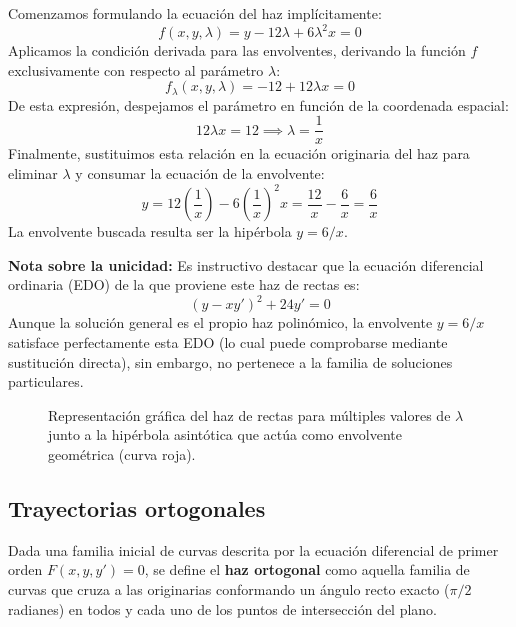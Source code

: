 \begin{tcolorbox}
Comenzamos formulando la ecuación del haz implícitamente:
$$ f(x, y, \lambda) = y - 12\lambda + 6\lambda^2 x = 0 $$
Aplicamos la condición derivada para las envolventes, derivando la función $f$ exclusivamente con respecto al parámetro $\lambda$:
$$ f_\lambda(x, y, \lambda) = -12 + 12\lambda x = 0 $$
De esta expresión, despejamos el parámetro en función de la coordenada espacial:
$$ 12\lambda x = 12 \implies \lambda = \frac{1}{x} $$
Finalmente, sustituimos esta relación en la ecuación originaria del haz para eliminar $\lambda$ y consumar la ecuación de la envolvente:
$$ y = 12\left(\frac{1}{x}\right) - 6\left(\frac{1}{x}\right)^2 x = \frac{12}{x} - \frac{6}{x} = \frac{6}{x} $$
La envolvente buscada resulta ser la hipérbola $y = 6/x$.

\textbf{Nota sobre la unicidad:} Es instructivo destacar que la ecuación diferencial ordinaria (EDO) de la que proviene este haz de rectas es:
$$ (y - xy')^2 + 24y' = 0 $$
Aunque la solución general es el propio haz polinómico, la envolvente $y = 6/x$ satisface perfectamente esta EDO (lo cual puede comprobarse mediante sustitución directa), sin embargo, no pertenece a la familia de soluciones particulares.

\begin{figure}[H]
    \centering
    
    \caption{Representación gráfica del haz de rectas para múltiples valores de $\lambda$ junto a la hipérbola asintótica que actúa como envolvente geométrica (curva roja).}
\end{figure}
\end{tcolorbox}

\subsection{Trayectorias ortogonales}

Dada una familia inicial de curvas descrita por la ecuación diferencial de primer orden $F(x, y, y') = 0$, se define el \textbf{haz ortogonal} como aquella familia de curvas que cruza a las originarias conformando un ángulo recto exacto ($\pi/2$ radianes) en todos y cada uno de los puntos de intersección del plano.

